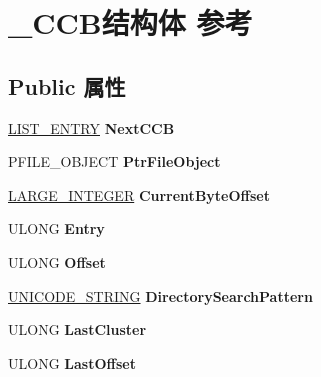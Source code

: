 \hypertarget{struct___c_c_b}{}\section{\+\_\+\+C\+C\+B结构体 参考}
\label{struct___c_c_b}
\subsection*{Public 属性}
\begin{DoxyCompactItemize}
\item 
\mbox{\label{struct___c_c_b_ab7214100ae030fd3055cb4f16c481b36}} 
\hyperlink{struct___l_i_s_t___e_n_t_r_y}{L\+I\+S\+T\+\_\+\+E\+N\+T\+RY} {\bfseries Next\+C\+CB}
\item 
\mbox{\label{struct___c_c_b_acc74b77f7cedeaec885199e4580d098d}} 
P\+F\+I\+L\+E\+\_\+\+O\+B\+J\+E\+CT {\bfseries Ptr\+File\+Object}
\item 
\mbox{\label{struct___c_c_b_adb95e311c77d112f31d43aa0abca4ea9}} 
\hyperlink{union___l_a_r_g_e___i_n_t_e_g_e_r}{L\+A\+R\+G\+E\+\_\+\+I\+N\+T\+E\+G\+ER} {\bfseries Current\+Byte\+Offset}
\item 
\mbox{\label{struct___c_c_b_a8f8198e37445c5da1051b01d315bcb56}} 
U\+L\+O\+NG {\bfseries Entry}
\item 
\mbox{\label{struct___c_c_b_a2e996e571dcb6fb4c7d56289bd35d9d6}} 
U\+L\+O\+NG {\bfseries Offset}
\item 
\mbox{\label{struct___c_c_b_aba74b4d705550e096986708e33cea062}} 
\hyperlink{struct___u_n_i_c_o_d_e___s_t_r_i_n_g}{U\+N\+I\+C\+O\+D\+E\+\_\+\+S\+T\+R\+I\+NG} {\bfseries Directory\+Search\+Pattern}
\item 
\mbox{\label{struct___c_c_b_ae0d687115794b8bc75a2f46f76f35cee}} 
U\+L\+O\+NG {\bfseries Last\+Cluster}
\item 
\mbox{\label{struct___c_c_b_a80ff6aedaca68e65763bc8e4e088a76a}} 
U\+L\+O\+NG {\bfseries Last\+Offset}
\item 
\mbox{\label{struct___c_c_b_af5b874d69a8154740b34bfc99ef1d071}} 

\end{DoxyCompactItemize}
